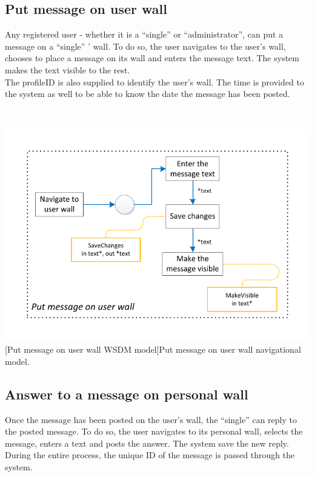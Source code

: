 \documentclass[11pt, a4paper,svglistings,oneside]{book}
\begin{document}
\subsection{Put message on user wall}

Any registered user - whether it is a ``single'' or ``administrator'', can put a message on a ``single'' ' wall. To do so, the user navigates to the user's wall, chooses to place a message on its wall and enters the message text. The system makes the text visible to the rest. \\
The profileID is also supplied to identify the user's wall. The time is provided to the system as well to be able to know the date the message has been posted.

$\;$ \\
\noindent\begin{minipage}{\textwidth}
    \centering
   \includegraphics[scale=1]{nav_PutMessageOnUserWall.pdf}
 [Put message on user wall WSDM model]{Put message on user wall navigational model.}
\end{minipage}

\subsection{Answer to a message on personal wall}

Once the message has been posted on the user's wall, the ``single'' can reply to the posted message. To do so, the user navigates to its personal wall, selects the message, enters a text and posts the answer. The system save the new reply. During the entire process, the unique ID of the message is passed through the system. 
\end{document}
